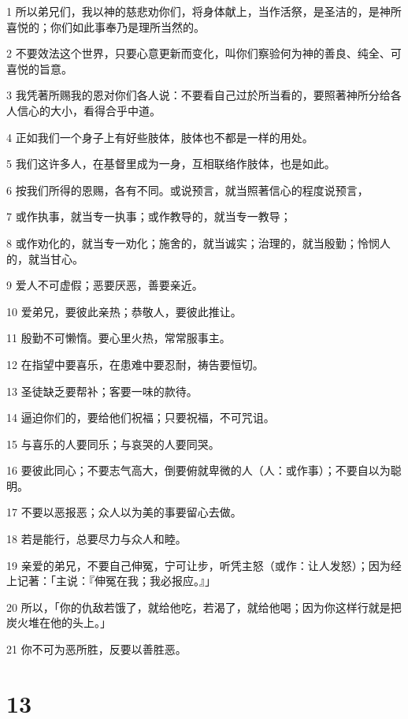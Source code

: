 \par 1 所以弟兄们，我以神的慈悲劝你们，将身体献上，当作活祭，是圣洁的，是神所喜悦的；你们如此事奉乃是理所当然的。
\par 2 不要效法这个世界，只要心意更新而变化，叫你们察验何为神的善良、纯全、可喜悦的旨意。
\par 3 我凭著所赐我的恩对你们各人说：不要看自己过於所当看的，要照著神所分给各人信心的大小，看得合乎中道。
\par 4 正如我们一个身子上有好些肢体，肢体也不都是一样的用处。
\par 5 我们这许多人，在基督里成为一身，互相联络作肢体，也是如此。
\par 6 按我们所得的恩赐，各有不同。或说预言，就当照著信心的程度说预言，
\par 7 或作执事，就当专一执事；或作教导的，就当专一教导；
\par 8 或作劝化的，就当专一劝化；施舍的，就当诚实；治理的，就当殷勤；怜悯人的，就当甘心。
\par 9 爱人不可虚假；恶要厌恶，善要亲近。
\par 10 爱弟兄，要彼此亲热；恭敬人，要彼此推让。
\par 11 殷勤不可懒惰。要心里火热，常常服事主。
\par 12 在指望中要喜乐，在患难中要忍耐，祷告要恒切。
\par 13 圣徒缺乏要帮补；客要一味的款待。
\par 14 逼迫你们的，要给他们祝福；只要祝福，不可咒诅。
\par 15 与喜乐的人要同乐；与哀哭的人要同哭。
\par 16 要彼此同心；不要志气高大，倒要俯就卑微的人（人：或作事）；不要自以为聪明。
\par 17 不要以恶报恶；众人以为美的事要留心去做。
\par 18 若是能行，总要尽力与众人和睦。
\par 19 亲爱的弟兄，不要自己伸冤，宁可让步，听凭主怒（或作：让人发怒）；因为经上记著：「主说：『伸冤在我；我必报应。』」
\par 20 所以，「你的仇敌若饿了，就给他吃，若渴了，就给他喝；因为你这样行就是把炭火堆在他的头上。」
\par 21 你不可为恶所胜，反要以善胜恶。

\chapter{13}

